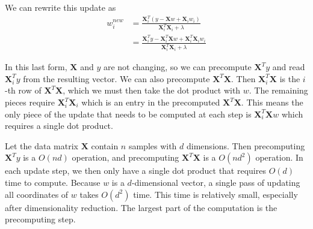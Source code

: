\documentclass[11pt]{article}
\begin{document}
We can rewrite this update as
\begin{align*}
  w_i^{new} &= \frac{\mathbf{X}_i^T (y - \mathbf{X} w + \mathbf{X}_i w_i) }{\mathbf{X}_i^T \mathbf{X}_i + \lambda} \\
  &= \frac{\mathbf{X}_i^T y - \mathbf{X}_i^T \mathbf{X} w + \mathbf{X}_i^T \mathbf{X}_i w_i}{\mathbf{X}_i^T \mathbf{X}_i + \lambda}
\end{align*}

In this last form, $\mathbf{X}$ and $y$ are not changing, so we can precompute $\mathbf{X}^T y$ and read $\mathbf{X}_i^T y$ from the resulting vector.
We can also precompute $\mathbf{X}^T \mathbf{X}$. Then $\mathbf{X}_i^T \mathbf{X}$ is the $i$-th row of $\mathbf{X}^T \mathbf{X}$, which we must then
take the dot product with $w$. The remaining pieces require $\mathbf{X}_i^T \mathbf{X}_i$ which is an entry in the precomputed $\mathbf{X}^T
\mathbf{X}$. This means the only piece of the update that needs to be computed at each step is $\mathbf{X}_i^T \mathbf{X} w$ which requires a single
dot product.

Let the data matrix $\mathbf{X}$ contain $n$ samples with $d$ dimensions. Then precomputing $\mathbf{X}^T y$ is a $O(n d)$ operation, and precomputing
$\mathbf{X}^T \mathbf{X}$ is a $O(n d^2)$ operation. In each update step, we then only have a single dot product that requires $O(d)$ time to compute.
Because $w$ is a $d$-dimensional vector, a single pass of updating all coordinates of $w$ takes $O(d^2)$ time. This time is relatively small,
especially after dimensionality reduction. The largest part of the computation is the precomputing step.
\end{document}
